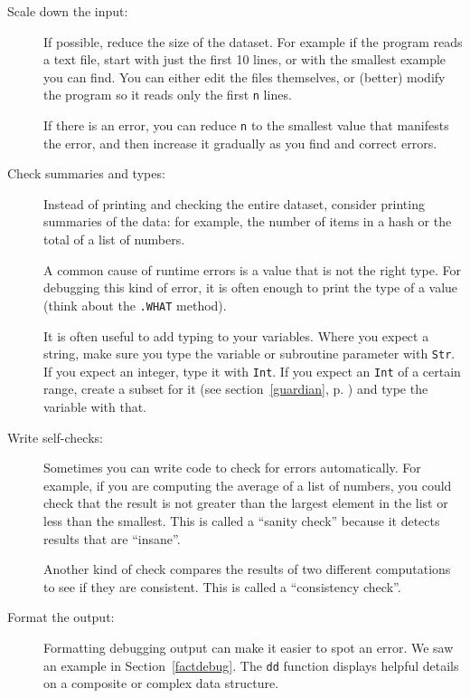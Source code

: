 \begin{description}

\item[Scale down the input:] If possible, reduce the size of the
dataset.  For example if the program reads a text file, start with
just the first 10 lines, or with the smallest example you can find.
You can either edit the files themselves, or (better) modify the
program so it reads only the first {\tt n} lines.

If there is an error, you can reduce {\tt n} to the smallest
value that manifests the error, and then increase it gradually
as you find and correct errors.

\item[Check summaries and types:] Instead of printing and checking the
entire dataset, consider printing summaries of the data: for example,
the number of items in a hash or the total of a list of numbers.

A common cause of runtime errors is a value that is not the right
type.  For debugging this kind of error, it is often enough to print
the type of a value (think about the {\tt .WHAT} method).

It is often useful to add typing to your variables. Where you 
expect a string, make sure you type the variable or subroutine 
parameter with {\tt Str}. If you expect an integer, type it with 
{\tt Int}. If you expect an {\tt Int} of a certain range, create 
a subset for it (see section~\ref{guardian}, p. \pageref{guardian}) 
and type the variable with that.

\item[Write self-checks:]  Sometimes you can write code to check
for errors automatically.  For example, if you are computing the
average of a list of numbers, you could check that the result is
not greater than the largest element in the list or less than
the smallest.  This is called a ``sanity check'' because it detects
results that are ``insane''.

Another kind of check compares the results of two different
computations to see if they are consistent.  This is called a
``consistency check''.

\item[Format the output:] Formatting debugging output
can make it easier to spot an error.  We saw an example in
Section~\ref{factdebug}.  The {\tt dd} function displays 
helpful details on a composite or complex data structure.


\end{description}

